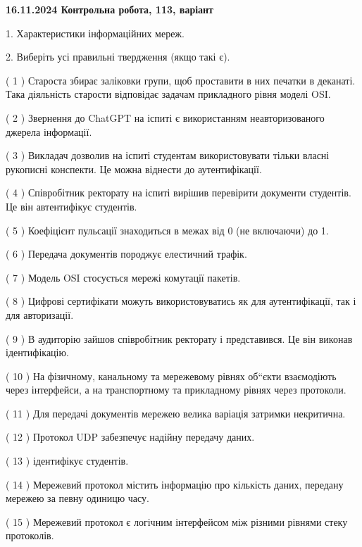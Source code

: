 \documentclass[12pt, ukrainian]{article}
\begin{document}
\vspace{4mm}
\newpage
\begin {large}

\textbf{16.11.2024 Контрольна робота, 113, варіант  }\par


{
1. Характеристики інформаційних мереж.



\vspace{5mm}
2. Виберіть усі правильні твердження (якщо такі є).\par
\vspace{2mm}

( 1 ) Староста збирає заліковки групи, щоб проставити в них печатки в деканаті. Така діяльність старости відповідає задачам прикладного рівня моделі OSI.

( 2 ) Звернення до ChatGPT на іспиті є використанням неавторизованого джерела інформації.

( 3 ) Викладач дозволив на іспиті студентам використовувати тільки власні рукописні конспекти. Це можна віднести до аутентифікації.

( 4 ) Співробітник ректорату на іспиті вирішив перевірити документи студентів. Це він автентифікує студентів.

( 5 ) Коефіцієнт пульсації знаходиться в межах від 0 (не включаючи) до 1.

( 6 ) Передача документів породжує елестичний трафік.

( 7 ) Модель OSI стосується мережі комутації пакетів.

( 8 ) Цифрові сертифікати можуть використовуватись як для аутентифікації, так і для авторизації.

( 9 ) В аудиторію зайшов співробітник ректорату і представився. Це він виконав ідентифікацію.

( 10 ) На фізичному, канальному та мережевому рівнях об“єкти взаємодіють через інтерфейси, а на транспортному та прикладному рівнях через протоколи.

( 11 ) Для передачі документів мережею велика варіація затримки некритична.

( 12 ) Протокол UDP забезпечує надійну передачу даних.

( 13 ) ідентифікує студентів.

( 14 ) Мережевий протокол містить інформацію про кількість даних, передану мережею за певну одиницю часу.

( 15 ) Мережевий протокол є логічним інтерфейсом між різними рівнями стеку протоколів.
}
\end {large}
\end{document}
